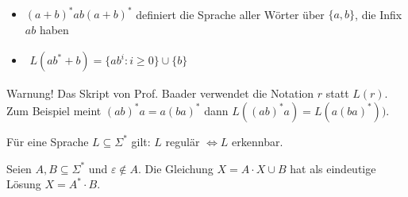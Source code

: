 \begin{beispiel}\label{beisp5.4}\
	\begin{itemize}
		\item $(a+b)^\ast ab(a+b)^\ast$ definiert die Sprache aller Wörter über $\lbrace a,b\rbrace$, die Infix $ab$ haben
		\item $\begin{aligned}
			L(ab^\ast+b)=\big\lbrace ab^i:i\geq0\big\rbrace\cup\lbrace b\rbrace
		\end{aligned}$
	\end{itemize}
\end{beispiel}

Warnung! Das Skript von Prof. Baader verwendet die Notation $r$ statt $L(r)$.
Zum Beispiel meint $(ab)^\ast a=a(ba)^\ast$ dann $L((ab)^\ast a)=L(a(ba)^\ast))$.

\begin{satz}[Kleene]\label{satz5.5Kleene}\enter
	Für eine Sprache $L\subseteq\Sigma^\ast$ gilt: $L$ regulär $\Longleftrightarrow L$ erkennbar.
\end{satz}

\begin{lemma}[Arden]\label{lemma5.7Arden}\enter
	Seien $A,B\subseteq\Sigma^\ast$ und $\varepsilon\not\in A$.
	Die Gleichung $X=A\cdot X\cup B$ hat als eindeutige Lösung $X=A^\ast\cdot B$.
\end{lemma}
